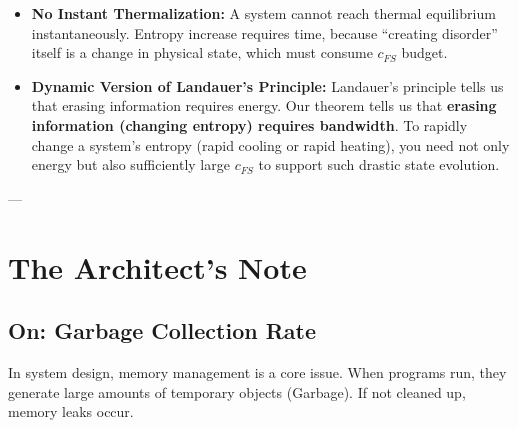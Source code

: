 \documentclass[11pt,a4paper,twoside]{book}
\begin{document}
\begin{itemize}
\item \textbf{No Instant Thermalization:} A system cannot reach thermal equilibrium instantaneously. Entropy increase requires time, because ``creating disorder'' itself is a change in physical state, which must consume \textbf{$c_{FS}$} budget.

\item \textbf{Dynamic Version of Landauer's Principle:} Landauer's principle tells us that erasing information requires energy. Our theorem tells us that \textbf{erasing information (changing entropy) requires bandwidth}. To rapidly change a system's entropy (rapid cooling or rapid heating), you need not only energy but also sufficiently large \textbf{$c_{FS}$} to support such drastic state evolution.
\end{itemize}

---

\section{The Architect's Note}

\subsection{On: Garbage Collection Rate}

In system design, memory management is a core issue. When programs run, they generate large amounts of temporary objects (Garbage). If not cleaned up, memory leaks occur.
\end{document}
